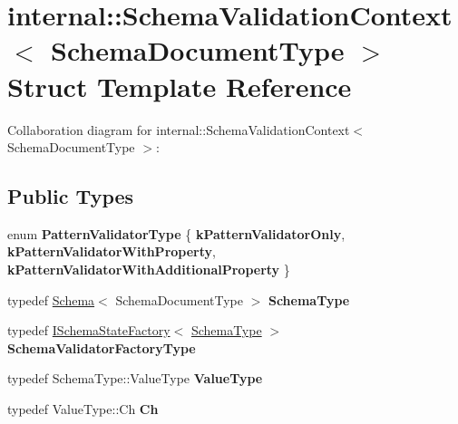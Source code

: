 \hypertarget{structinternal_1_1_schema_validation_context}{}\section{internal\+:\+:Schema\+Validation\+Context$<$ Schema\+Document\+Type $>$ Struct Template Reference}
\label{structinternal_1_1_schema_validation_context}


Collaboration diagram for internal\+:\+:Schema\+Validation\+Context$<$ Schema\+Document\+Type $>$\+:
\subsection*{Public Types}
\begin{DoxyCompactItemize}
\item 
\mbox{\label{structinternal_1_1_schema_validation_context_a4fb1b8fe7ecb9d4608e6b0ac0716826c}} 
enum {\bfseries Pattern\+Validator\+Type} \{ {\bfseries k\+Pattern\+Validator\+Only}, 
{\bfseries k\+Pattern\+Validator\+With\+Property}, 
{\bfseries k\+Pattern\+Validator\+With\+Additional\+Property}
 \}
\item 
\mbox{\label{structinternal_1_1_schema_validation_context_a79b155ab3711b97b6e33ced450614397}} 
typedef \hyperlink{classinternal_1_1_schema}{Schema}$<$ Schema\+Document\+Type $>$ {\bfseries Schema\+Type}
\item 
\mbox{\label{structinternal_1_1_schema_validation_context_a33fa91fd8e880d1adb9b891fe441f110}} 
typedef \hyperlink{classinternal_1_1_i_schema_state_factory}{I\+Schema\+State\+Factory}$<$ \hyperlink{classinternal_1_1_schema}{Schema\+Type} $>$ {\bfseries Schema\+Validator\+Factory\+Type}
\item 
\mbox{\label{structinternal_1_1_schema_validation_context_acc134e808d3a4dbe8834eb1a3e98e816}} 
typedef Schema\+Type\+::\+Value\+Type {\bfseries Value\+Type}
\item 
\mbox{\label{structinternal_1_1_schema_validation_context_abd905cd1513b117f1db68b58d6c41daf}} 
typedef Value\+Type\+::\+Ch {\bfseries Ch}
\end{DoxyCompactItemize}
